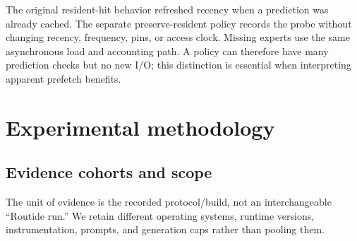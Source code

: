 \documentclass[11pt]{article}
\begin{document}
The original resident-hit behavior refreshed recency when a prediction was
already cached. The separate preserve-resident policy records the probe
without changing recency, frequency, pins, or access clock. Missing experts
use the same asynchronous load and accounting path. A policy can therefore
have many prediction checks but no new I/O; this distinction is essential
when interpreting apparent prefetch benefits.

\hypertarget{experimental-methodology}{%
\section{Experimental methodology}\label{experimental-methodology}}

\hypertarget{evidence-cohorts-and-scope}{%
\subsection{Evidence cohorts and scope}\label{evidence-cohorts-and-scope}}

The unit of evidence is the recorded protocol/build, not an interchangeable
``Routide run.'' We retain different operating systems, runtime versions,
instrumentation, prompts, and generation caps rather than pooling them.
\end{document}
